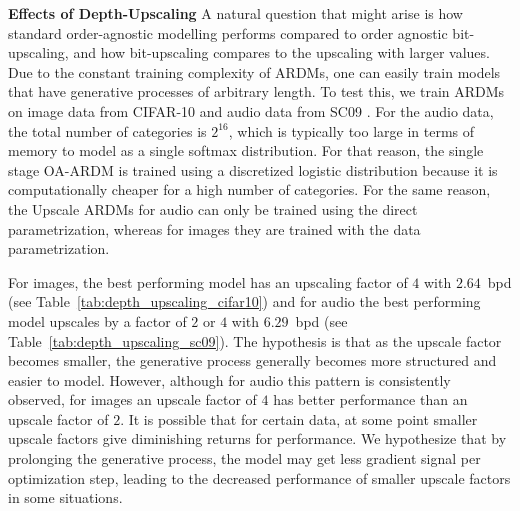 \documentclass{article} \usepackage{iclr2022_conference,times}
\begin{document}
\textbf{Effects of Depth-Upscaling} \hspace{.2cm}
A natural question that might arise is how standard order-agnostic modelling performs compared to order agnostic bit-upscaling, and how bit-upscaling compares to the upscaling with larger values. Due to the constant training complexity of ARDMs, one can easily train models that have generative processes of arbitrary length. To test this, we train ARDMs on image data from CIFAR-10 and audio data from SC09 \citep{speechcommandsv2}. For the audio data, the total number of categories is $2^{16}$, which is typically too large in terms of memory to model as a single softmax distribution. For that reason, the single stage OA-ARDM is trained using a discretized logistic distribution because it is computationally cheaper for a high number of categories. For the same reason, the Upscale ARDMs for audio can only be trained using the direct parametrization, whereas for images they are trained with the data parametrization. 


For images, the best performing model has an upscaling factor of $4$ with $2.64$~bpd (see Table~\ref{tab:depth_upscaling_cifar10}) and for audio the best performing model upscales by a factor of $2$ or $4$ with $6.29$~bpd (see Table~\ref{tab:depth_upscaling_sc09}). The hypothesis is that as the upscale factor becomes smaller, the generative process generally becomes more structured and easier to model. However, although for audio this pattern is consistently observed, for images an upscale factor of $4$ has better performance than an upscale factor of $2$. It is possible that for certain data, at some point smaller upscale factors give diminishing returns for performance. We hypothesize that by prolonging the generative process, the model may get less gradient signal per optimization step, leading to the decreased performance of smaller upscale factors in some situations.
\end{document}
